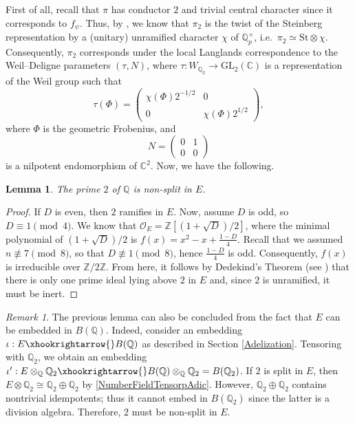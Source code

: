 \documentclass[11pt]{amsart}
\newcommand{\bigo}{\mathcal{O}}
\newcommand{\Z}{\mathbb{Z}}
\newcommand{\Q}{\mathbb{Q}}
\newcommand{\C}{\mathbb{C}}
\newcommand{\GL}{\mathrm{GL}}
\newtheorem{lemma}[theorem]{Lemma}
\theoremstyle{definition}
\theoremstyle{remark}
\newtheorem{remark}[theorem]{Remark}
\begin{document}
First of all, recall that $\pi$ has conductor $2$ and trivial central character since it corresponds to $f_{\psi}$. Thus, by \cite[Prop. 2.8]{LocalComponents}, we know that $\pi_2$ is the twist of the Steinberg representation by a (unitary) unramified character $\chi$ of $\Q_{p}^{\times}$, i.e.~$\pi_2 \simeq \mathrm{St}\otimes \chi$. Consequently, $\pi_2$ corresponds under the local Langlands correspondence to the Weil--Deligne parameters $(\tau, N)$, where $\tau:W_{\Q_2} \rightarrow \GL_2(\C)$ is a representation of the Weil group such that 
\begin{equation*}
    \tau(\Phi) = \begin{pmatrix}
        \chi(\Phi)2^{-1/2} & 0 \\ 0 & \chi(\Phi) 2^{1/2}
    \end{pmatrix},
\end{equation*}
where $\Phi$ is the geometric Frobenius, and 
\begin{equation}
    N = \begin{pmatrix}
        0 & 1 \\ 0 & 0
    \end{pmatrix} \label{NilpotentEndo}
\end{equation}
is a nilpotent endomorphism of $\C^2$. Now, we have the following.

\begin{lemma}\label{2nonsplit}
The prime $2$ of $\Q$ is non-split in $E$.
\end{lemma}

\begin{proof}
If $D$ is even, then $2$ ramifies in $E$. Now, assume $D$ is odd, so $D\equiv 1 \pmod{4}$. We know that $\bigo_{E} = \Z[(1+\sqrt{D})/2]$, where the minimal polynomial of $(1+\sqrt{D})/2$ is $f(x) = x^2 - x + \frac{1-D}{4}$. Recall that we assumed $n\not\equiv 7 \pmod{8}$, so that $D\not\equiv 1 \pmod{8}$, hence $\frac{1-D}{4}$ is odd. Consequently, $f(x)$ is irreducible over $\Z/2\Z$. From here, it follows by Dedekind's Theorem (see \cite[Thm. 3.41]{milneANT}) that there is only one prime ideal lying above $2$ in $E$ and, since $2$ is unramified, it must be inert.
\end{proof}

\begin{remark}
The previous lemma can also be concluded from the fact that $E$ can be embedded in $B(\Q)$. Indeed, consider an embedding $\iota:E \xhookrightarrow{} B(\Q)$ as described in Section \ref{Adelization}. Tensoring with $\Q_2$, we obtain an embedding $\iota' : E\otimes_{\Q} \Q_2 \xhookrightarrow{} B(\Q) \otimes_{\Q} \Q_2 = B(\Q_2)$. If $2$ is split in $E$, then $E\otimes \Q_2 \cong \Q_2 \oplus \Q_2$ by \eqref{NumberFieldTensorpAdic}. However, $\Q_2 \oplus \Q_2$ contains nontrivial idempotents; thus it cannot embed in $B(\Q_2)$ since the latter is a division algebra. Therefore, $2$ must be non-split in $E$. 
\end{remark}
\end{document}
